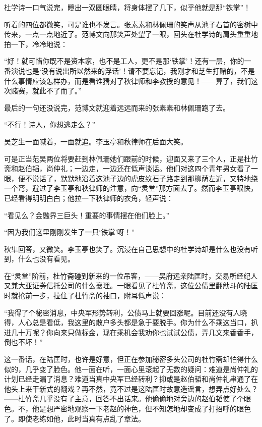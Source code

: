 \par 杜学诗一口气说完，瞪出一双圆眼睛，将身体摆了几下，似乎他就是那“铁掌”！
\par 听着的四位都微笑，可是谁也不发言。张素素和林佩珊的笑声从池子右首的密树中传来，一点一点地近了。范博文向那笑声处望了一眼，回头在杜学诗的肩头重重地拍一下，冷冷地说：
\par “好！就可惜你既不是资本家，也不是工人，更不是那‘铁掌’！还有一层，你的一番演说也是‘没有说出所以然来的浮话’！请不要忘记，我刚才和芝生打赌的，不是什么事情应该怎样办，而是看谁猜对了秋律师和李教授的意见！——算了，我们这次赌赛，就此不了而了。”
\par 最后的一句还没说完，范博文就迎着远远而来的张素素和林佩珊跑了去。
\par “不行！诗人，你想逃走么？”
\par 吴芝生一面喊着，一面就追。李玉亭和秋律师在后面大笑。
\par 可是正当范吴两位将要赶到林佩珊她们跟前的时候，迎面又来了三个人，正是杜竹斋和赵伯韬，尚仲礼；一边走，一边还在低声谈话。他们对这四个青年男女看了一眼，便不说话了，默默地沿着这池子边的虎皮纹石子路走到那柳荫左近，又特地绕一个弯，避过了李玉亭和秋律师的注意，向“灵堂”那方面去了。然而李玉亭眼快，已经看得明明白白；他拉一下秋律师的衣角，轻声说：
\par “看见么？金融界三巨头！重要的事情摆在他们脸上。”
\par “因为我们这里刚刚发生了一只‘铁掌’呀！”
\par 秋隼回答，又微笑。李玉亭也笑了。沉浸在自己思想中的杜学诗却是什么也没有听到，什么也没有看见。
\par 在“灵堂”阶前，杜竹斋碰到新来的一位吊客，——吴府远亲陆匡时，交易所经纪人又兼大亚证券信托公司的什么襄理。一眼看见了杜竹斋，这位公债里翻觔斗的陆匡时就抢前一步，拉住了杜竹斋的袖口，附耳低声说：
\par “我得了个秘密消息，中央军形势转利，公债马上就要回涨呢。目前还没有人晓得，人心总是看低，我这里的散户多头都是急于要脱手。你为什么不乘这当口，扒进几十万呢？你向来只做标金，现在乘机会我劝你也试试公债，弄几文来香香手，倒也不坏！”
\par 这一番话，在陆匡时，也许是好意，但正在参加秘密多头公司的杜竹斋却怕得什么似的，几乎变了脸色。他一面在听，一面心里滚起了无数的疑问：难道是尚仲礼的计划已经走漏了消息？难道当真中央军已经转利？抑或是赵伯韬和尚仲礼串通了在他头上来干新式的翻戏？再不然，竟不过是这陆匡时故意造谣言，想弄点好处么？——杜竹斋几乎没有了主意，回答不出话来。他偷偷地对旁边的赵伯韬使了个眼色。不，他是想严密地观察一下老赵的神色，但不知怎地却变成了打招呼的眼色了。即使老练如他，此时当真有点乱了章法。
